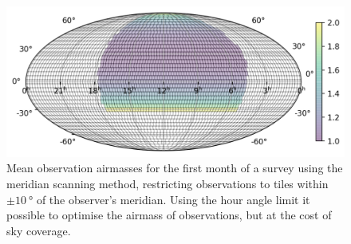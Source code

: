 \begin{colsection}
\begin{colsection}
\begin{figure}[p]
    \begin{center}
        \includegraphics[width=0.7\linewidth]{images/survey_sims/30_1N4_meridian_airmass.png}
    \end{center}
    \caption[Mean observation airmasses using the meridian scanning method]{
        Mean observation airmasses for the first month of a survey using the meridian scanning method, restricting observations to tiles within $\pm\SI{10}{\degree}$ of the observer's meridian. Using the hour angle limit it possible to optimise the airmass of observations, but at the cost of sky coverage.
    }\label{fig:survey_sim_airmass_meridian}
\end{figure}

\end{colsection}


\end{colsection}

